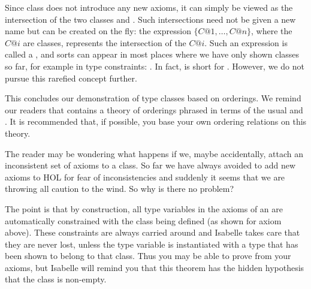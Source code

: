 \begin{isabellebody}
\begin{isamarkuptext}
Since class  does not introduce any new axioms, it can simply
be viewed as the intersection of the two classes  and . Such intersections need not be given a new name but can be created on
the fly: the expression $\{C@1,\dots,C@n\}$, where the $C@i$ are classes,
represents the intersection of the $C@i$. Such an expression is called a
, and sorts can appear in most places where we have only shown
classes so far, for example in type constraints: .
In fact,  is short for .
However, we do not pursue this rarefied concept further.

This concludes our demonstration of type classes based on orderings.  We
remind our readers that  contains a theory of
orderings phrased in terms of the usual \isa{{\isasymle}} and \isa{{\isacharless}}.
It is recommended that, if possible,
you base your own ordering relations on this theory.%
\end{isamarkuptext}%
%
%
\begin{isamarkuptext}%
The reader may be wondering what happens if we, maybe accidentally,
attach an inconsistent set of axioms to a class. So far we have always
avoided to add new axioms to HOL for fear of inconsistencies and suddenly it
seems that we are throwing all caution to the wind. So why is there no
problem?

The point is that by construction, all type variables in the axioms of an
 are automatically constrained with the class being
defined (as shown for axiom  above). These constraints are
always carried around and Isabelle takes care that they are never lost,
unless the type variable is instantiated with a type that has been shown to
belong to that class. Thus you may be able to prove 
from your axioms, but Isabelle will remind you that this
theorem has the hidden hypothesis that the class is non-empty.%
\end{isamarkuptext}%
\end{isabellebody}%
